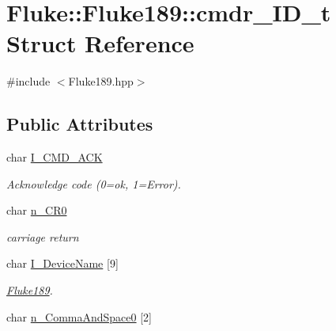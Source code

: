 \hypertarget{structFluke_1_1Fluke189_1_1cmdr__ID__t}{
\section{Fluke::Fluke189::cmdr\_\-ID\_\-t Struct Reference}
\label{structFluke_1_1Fluke189_1_1cmdr__ID__t}
}


{\ttfamily \#include $<$Fluke189.hpp$>$}\subsection*{Public Attributes}
\begin{DoxyCompactItemize}
\item 
\hypertarget{structFluke_1_1Fluke189_1_1cmdr__ID__t_a7d63c9116d51d36eb03dd62e2b7a32c2}{
char \hyperlink{structFluke_1_1Fluke189_1_1cmdr__ID__t_a7d63c9116d51d36eb03dd62e2b7a32c2}{I\_\-CMD\_\-ACK}}
\label{structFluke_1_1Fluke189_1_1cmdr__ID__t_a7d63c9116d51d36eb03dd62e2b7a32c2}

\begin{DoxyCompactList}\small\item\em Acknowledge code (0=ok, 1=Error). \item\end{DoxyCompactList}\item 
\hypertarget{structFluke_1_1Fluke189_1_1cmdr__ID__t_a2e053c2ef8d2444925eacc5ed6525e23}{
char \hyperlink{structFluke_1_1Fluke189_1_1cmdr__ID__t_a2e053c2ef8d2444925eacc5ed6525e23}{n\_\-CR0}}
\label{structFluke_1_1Fluke189_1_1cmdr__ID__t_a2e053c2ef8d2444925eacc5ed6525e23}

\begin{DoxyCompactList}\small\item\em carriage return \item\end{DoxyCompactList}\item 
\hypertarget{structFluke_1_1Fluke189_1_1cmdr__ID__t_af64add63da87318b73fb3d33be0579bf}{
char \hyperlink{structFluke_1_1Fluke189_1_1cmdr__ID__t_af64add63da87318b73fb3d33be0579bf}{I\_\-DeviceName} \mbox{[}9\mbox{]}}
\label{structFluke_1_1Fluke189_1_1cmdr__ID__t_af64add63da87318b73fb3d33be0579bf}

\begin{DoxyCompactList}\small\item\em \hyperlink{classFluke_1_1Fluke189}{Fluke189}. \item\end{DoxyCompactList}\item 
\hypertarget{structFluke_1_1Fluke189_1_1cmdr__ID__t_a091738bf2dabd1d9a6c96eb4fb30060d}{
char \hyperlink{structFluke_1_1Fluke189_1_1cmdr__ID__t_a091738bf2dabd1d9a6c96eb4fb30060d}{n\_\-CommaAndSpace0} \mbox{[}2\mbox{]}}
\label{structFluke_1_1Fluke189_1_1cmdr__ID__t_a091738bf2dabd1d9a6c96eb4fb30060d}


\end{DoxyCompactItemize}
